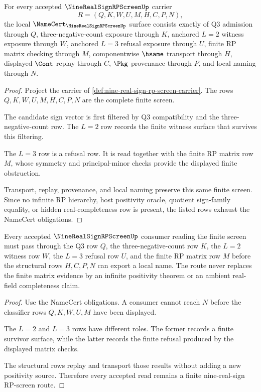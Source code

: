 \begin{theorem}
\label{thm:nine-real-sign-rp-screen-namecert-obligations}
For every accepted $\NineRealSignRPScreenUp$ carrier
$$
R=(Q,K,W,U,M,H,C,P,N),
$$
the local $\NameCert_{\NineRealSignRPScreenUp}$ surface consists exactly of Q3 admission through $Q$, three-negative-count exposure through $K$, anchored $L=2$ witness exposure through $W$, anchored $L=3$ refusal exposure through $U$, finite RP matrix checking through $M$, componentwise $\hsame$ transport through $H$, displayed $\Cont$ replay through $C$, $\Pkg$ provenance through $P$, and local naming through $N$.
\end{theorem}
\begin{proof}
Project the carrier of \autoref{def:nine-real-sign-rp-screen-carrier}. The rows $Q,K,W,U,M,H,C,P,N$ are the complete finite screen.

The candidate sign vector is first filtered by Q3 compatibility and the three-negative-count row. The $L=2$ row records the finite witness surface that survives this filtering.

The $L=3$ row is a refusal row. It is read together with the finite RP matrix row $M$, whose symmetry and principal-minor checks provide the displayed finite obstruction.

Transport, replay, provenance, and local naming preserve this same finite screen. Since no infinite RP hierarchy, host positivity oracle, quotient sign-family equality, or hidden real-completeness row is present, the listed rows exhaust the NameCert obligations.
\end{proof}

\begin{theorem}
\label{thm:nine-real-sign-rp-screen-finite-route}
Every accepted $\NineRealSignRPScreenUp$ consumer reading the finite screen must pass through the Q3 row $Q$, the three-negative-count row $K$, the $L=2$ witness row $W$, the $L=3$ refusal row $U$, and the finite RP matrix row $M$ before the structural rows $H,C,P,N$ can export a local name. The route never replaces the finite matrix evidence by an infinite positivity theorem or an ambient real-field completeness claim.
\end{theorem}
\begin{proof}
Use the NameCert obligations. A consumer cannot reach $N$ before the classifier rows $Q,K,W,U,M$ have been displayed.

The $L=2$ and $L=3$ rows have different roles. The former records a finite survivor surface, while the latter records the finite refusal produced by the displayed matrix checks.

The structural rows replay and transport those results without adding a new positivity source. Therefore every accepted read remains a finite nine-real-sign RP-screen route.
\end{proof}

